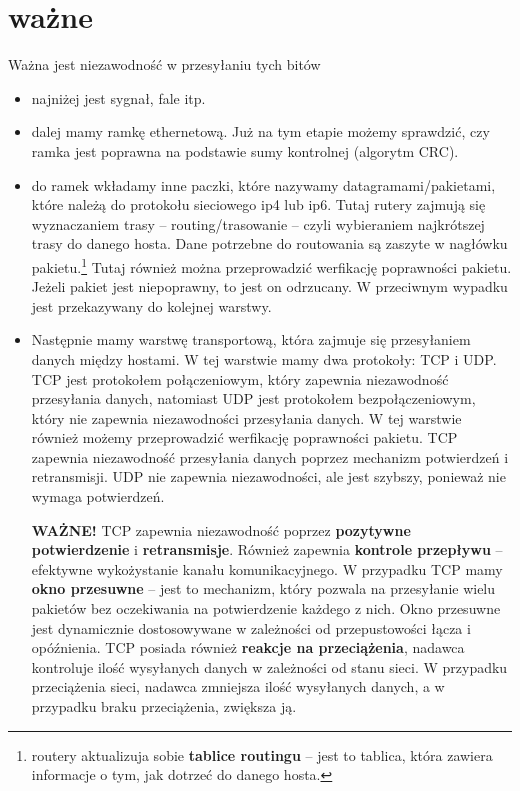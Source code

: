 \documentclass[11pt,a4paper]{article}
\begin{document}
\section{ważne}
Ważna jest niezawodność w przesyłaniu tych bitów
\begin{itemize}
    \item najniżej jest sygnał, fale itp.
    \item dalej mamy ramkę ethernetową. Już na tym etapie możemy sprawdzić, czy ramka jest poprawna na podstawie sumy kontrolnej (algorytm CRC).
    \item do ramek wkładamy inne paczki, które nazywamy datagramami/pakietami, które należą do protokołu sieciowego ip4 lub ip6. Tutaj rutery zajmują się wyznaczaniem trasy -- routing/trasowanie -- czyli wybieraniem najkrótszej trasy do danego hosta. Dane potrzebne do routowania są zaszyte w nagłówku pakietu.\footnote{routery aktualizuja sobie \textbf{tablice routingu} -- jest to tablica, która zawiera informacje o tym, jak dotrzeć do danego hosta.} Tutaj również można przeprowadzić werfikację poprawności pakietu. Jeżeli pakiet jest niepoprawny, to jest on odrzucany. W przeciwnym wypadku jest przekazywany do kolejnej warstwy.
    \item Następnie mamy warstwę transportową, która zajmuje się przesyłaniem danych między hostami. W tej warstwie mamy dwa protokoły: TCP i UDP. TCP jest protokołem połączeniowym, który zapewnia niezawodność przesyłania danych, natomiast UDP jest protokołem bezpołączeniowym, który nie zapewnia niezawodności przesyłania danych. W tej warstwie również możemy przeprowadzić werfikację poprawności pakietu. TCP zapewnia niezawodność przesyłania danych poprzez mechanizm potwierdzeń i retransmisji. UDP nie zapewnia niezawodności, ale jest szybszy, ponieważ nie wymaga potwierdzeń.

        \textbf{WAŻNE!} TCP zapewnia niezawodność poprzez \textbf{pozytywne potwierdzenie} i \textbf{retransmisje}. Również zapewnia \textbf{kontrole przepływu} -- efektywne wykożystanie kanału komunikacyjnego. W przypadku TCP mamy \textbf{okno przesuwne} -- jest to mechanizm, który pozwala na przesyłanie wielu pakietów bez oczekiwania na potwierdzenie każdego z nich. Okno przesuwne jest dynamicznie dostosowywane w zależności od przepustowości łącza i opóźnienia. TCP posiada również \textbf{reakcje na przeciążenia}, nadawca kontroluje ilość wysyłanych danych w zależności od stanu sieci. W przypadku przeciążenia sieci, nadawca zmniejsza ilość wysyłanych danych, a w przypadku braku przeciążenia, zwiększa ją.


\end{itemize}
\end{document}
